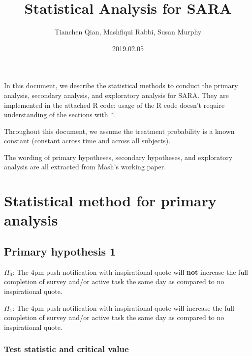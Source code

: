 \documentclass[11pt]{article}
\begin{document}
\title{Statistical Analysis for SARA}

\author{Tianchen Qian, Mashfiqui Rabbi, Susan Murphy}

\date{2019.02.05}

\maketitle
In this document, we describe the statistical methods to conduct the
primary analysis, secondary analysis, and exploratory analysis for
SARA. They are implemented in the attached R code; usage of the R
code doesn't require understanding of the sections with {*}.

Throughout this document, we assume the treatment probability is a
known constant (constant across time and across all subjects).

The wording of primary hypotheses, secondary hypotheses, and exploratory
analysis are all extracted from Mash's working paper.

\section{Statistical method for primary analysis}

\subsection{Primary hypothesis 1\label{subsec:Primary-hypothesis-1}}

$H_{0}$: The 4pm push notification with inspirational quote will
\textbf{not} increase the full completion of survey and/or active
task the same day as compared to no inspirational quote.

$H_{1}$: The 4pm push notification with inspirational quote will
increase the full completion of survey and/or active task the same
day as compared to no inspirational quote.

\subsubsection{Test statistic and critical value}
\end{document}
